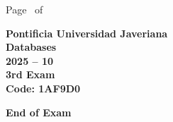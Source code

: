 \documentclass[11pt, addpoints, answers]{exam}\usepackage[utf8]{inputenc}
\begin{document}
\begin{coverpages}
\begin{center}
			\vspace{3mm}
			\leavevmode \hspace{5mm} 
		\end{center}
	\end{coverpages}

	\footer{} {Page \thepage\ of \numpages} {}

	\centering
	\textbf{\Large Pontificia Universidad Javeriana}\\
	\textbf{\Large Databases} \\
	\textbf{\large 2025 -- 10} \\
	\textbf{\large 3rd Exam} \\
	\textbf{Code: 1AF9D0}


	\begin{questions}
		
		
		
		
		
		
		
		
		
		
		
		
		
		
		
		
		
		
		
		
	\end{questions}

	\vspace{5mm}
	\noindent \textbf{End of Exam}
\end{document}
